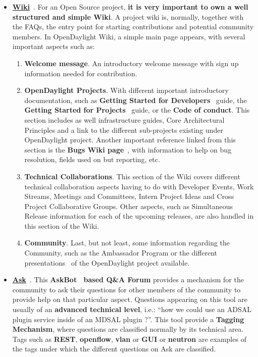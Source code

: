 \documentclass[a4paper, 12pt]{book}
\begin{document}
\begin{itemize}\itemsep0pt
\item{\textbf{\underline{Wiki}}}~\cite{OpenDaylightWiki}. For an Open Source project, \textbf{it is very important to own a well structured and simple Wiki}. A project wiki is, normally, together with the FAQs, the entry point for starting contributions and potential community members. In OpenDaylight Wiki, a simple main page appears, with several important aspects such as:
\begin{enumerate}\itemsep0pt
\item{\textbf{Welcome message}}. An introductory welcome message with sign up information needed for contribution.
\item{\textbf{OpenDaylight Projects}}. With different important introductory documentation, such as \textbf{Getting Started for Developers}~\cite{OpenDaylightDevStGuide} guide, the \textbf{Getting Started for Projects}~\cite{OpenDaylightProjStGuide} guide, or the \textbf{Code of conduct}. This section includes as well infrastructure guides, Core Architectural Principles and a link to the different sub-projects existing under OpenDaylight project.  Another important reference linked from this section is the \textbf{Bugs Wiki page}~\cite{OpenDaylightBugsWiki}, with information to help on bug resolution, fields used on but reporting, etc.
\item{\textbf{Technical Collaborations}}. This section of the Wiki covers different technical collaboration aspects having to do with Developer Events, Work Streams, Meetings and Committees, Intern Project Ideas and Cross Project Collaborative Groups. Other aspects, such as Simultaneous Release information for each of the upcoming releases, are also handled in this section of the Wiki.
\item{\textbf{Community}}. Last, but not least, some information regarding the Community, such as the Ambassador Program or the different presentations~\cite{OpenDaylightPresentations} of the OpenDaylight project available.
\end{enumerate}
\item{\textbf{\underline{Ask}}}~\cite{OpenDaylightAsk}. This \textbf{AskBot~\cite{AskBot} based Q\&A Forum} provides a mechanism for the community to ask their questions for other members of the community to provide help on that particular aspect. Questions appearing on this tool are usually of an \textbf{advanced technical level}, i.e.: ``how we could use an ADSAL plugin service inside of an MDSAL plugin ?''. This tool provide a \textbf{Tagging Mechanism}, where questions are classified normally by its technical area. Tags such as \textbf{REST}, \textbf{openflow}, \textbf{vlan} or \textbf{GUI} or \textbf{neutron} are examples of the tags under which the different questions on Ask are classified.

\end{itemize}
\end{document}
